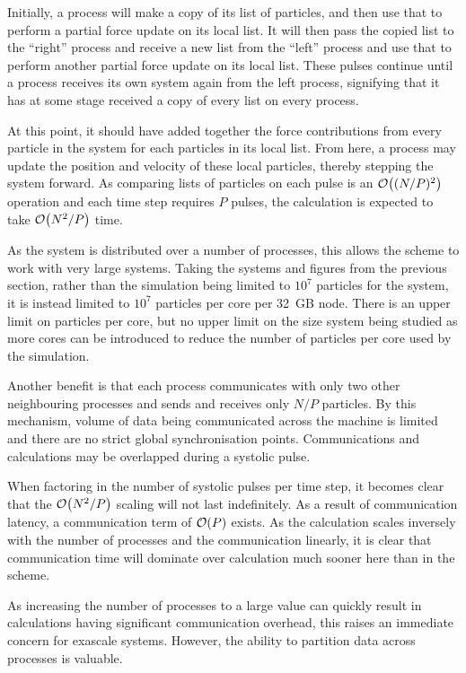 Initially, a process will make a copy of its list of particles,
and then use that to perform a partial force update on its local list.
%
It will then pass the copied list to the ``right'' process and
receive a new list from the ``left'' process and use that to perform
another partial force update on its local list.
%
These pulses continue until a process receives its own system again from
the left process, signifying that it has at some stage received
a copy of every list on every process.

At this point, it should have added together the force contributions from
every particle in the system for each particles in its local list.
%
From here, a process may update the position and velocity of these local
particles, thereby stepping the system forward.
%
As comparing lists of particles on each pulse is an $\mathcal{O}{\left({ (N/P)^2 }\right)}$ operation
and each time step requires $P$ pulses, the calculation is expected to take
$\mathcal{O}{\left({ N^2/P }\right)}$ time.


%
As the system is distributed over a number of processes, this allows
the scheme to work with very large systems.
%
Taking the systems and figures from the previous section,
rather than the simulation being limited to $10^7$ particles for the system,
it is instead limited to $10^7$ particles per core per 32~GB node.
%
There is an upper limit on particles per core, but no
upper limit on the size system being studied as more cores can be introduced
to reduce the number of particles per core used by the simulation.

Another benefit is that
each process communicates with only two other neighbouring processes
and sends and receives only $N/P$ particles.
%
By this mechanism, volume of data
being communicated across the machine is limited
and there are no strict global synchronisation points.
%
Communications and calculations may be overlapped during a systolic pulse.

When factoring in the number of systolic pulses per time step,
it becomes clear that the $\mathcal{O}{\left({ N^2/P }\right)}$ scaling will not last indefinitely.
%
As a result of communication latency, a communication term of
$\mathcal{O}{\left({ P }\right)}$ exists.
%
As the calculation scales inversely with the number of processes
and the communication linearly, it is clear that communication time will
dominate over calculation much sooner here than
in the \replicateddata{} scheme.

%
As increasing the number of processes to a large value
can quickly result in calculations having significant communication overhead,
this raises an immediate concern for exascale systems.
%
However, the ability to partition data across processes is valuable.


